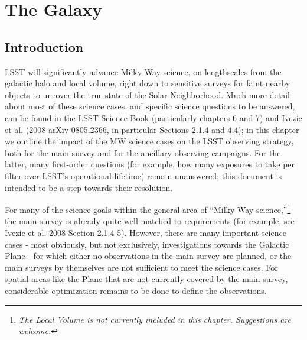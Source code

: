 \chapter[The Galaxy]{The Galaxy}
\def\chpname{galaxy}\label{chp:\chpname}



\section{Introduction}
\def\secname{intro}\label{sec:\secname}

LSST will significantly advance Milky Way science, on lengthscales
from the galactic halo and local volume, right down to sensitive
surveys for faint nearby objects to uncover the true state of the
Solar Neighborhood.
Much more detail about most of these science cases, and specific
science questions to be answered, can be found in the LSST Science
Book (particularly chapters 6 and 7) and Ivezic et al. (2008 arXiv
0805.2366, in particular Sections 2.1.4 and 4.4); in this chapter we
outline the impact of the MW science cases on the LSST observing
strategy, both for the main survey and for the ancillary observing
campaigns. For the latter, many first-order questions (for example, how
many exposures to take per filter over LSST’s operational lifetime)
remain unanswered; this document is intended to be a step towards
their resolution.

For many of the science goals within the general area of “Milky Way
science,”\footnote{{\it The Local Volume is not currently included in this chapter. Suggestions are welcome.}} the main survey is already quite well-matched to
requirements (for example, see Ivezic et al. 2008 Section
2.1.4-5). However, there are many important science cases - most
obviously, but not exclusively, investigations towards the Galactic
Plane - for which either no observations in the main survey are
planned, or the main surveys by themselves are not sufficient to meet
the science cases. For spatial areas like the Plane that are not
currently covered by the main survey, considerable optimization
remains to be done to define the observations.

